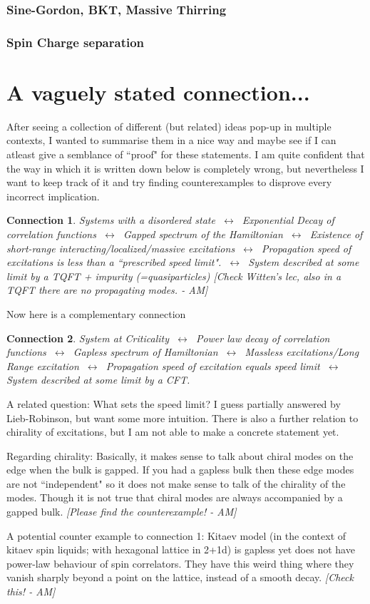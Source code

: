 \documentclass{article}
\newcommand\AM[1]{{\it \color{darkblue}  [#1 - AM]}}
\newtheorem{conn}{Connection}
\begin{document}
\subsubsection{Sine-Gordon, BKT, Massive Thirring}
\subsubsection{Spin Charge separation}
\section{A vaguely stated connection...}
After seeing a collection of different (but related) ideas pop-up in multiple contexts, I wanted to summarise them in a nice way and maybe see if I can atleast give a semblance of ``proof" for these statements. I am quite confident that the way in which it is written down below is completely wrong, but nevertheless I want to keep track of it and try finding counterexamples to disprove every incorrect implication.

\begin{conn}
    Systems with a disordered state $~\longleftrightarrow~$ Exponential Decay of correlation functions 
    $~\longleftrightarrow~$ Gapped spectrum of the Hamiltonian
    $~\longleftrightarrow~$ Existence of short-range interacting/localized/massive excitations
    $~\longleftrightarrow~$ Propagation speed of excitations is less than a ``prescribed speed limit".
    $~\longleftrightarrow~$ System described at some limit by a TQFT + impurity (=quasiparticles) \AM{Check Witten's lec, also in a TQFT there are no propagating modes.}
\end{conn}

Now here is a complementary connection
\begin{conn}
    System at Criticality 
    $~\longleftrightarrow~$ Power law decay of correlation functions
    $~\longleftrightarrow~$ Gapless spectrum of Hamiltonian
    $~\longleftrightarrow~$ Massless excitations/Long Range excitation
    $~\longleftrightarrow~$ Propagation speed of excitation equals speed limit
    $~\longleftrightarrow~$ System described at some limit by a CFT.
\end{conn}
A related question: What sets the speed limit? I guess partially answered by Lieb-Robinson, but want some more intuition. There is also a further relation to chirality of excitations, but I am not able to make a concrete statement yet.

Regarding chirality: Basically, it makes sense to talk about chiral modes on the edge when the bulk is gapped. If you had a gapless bulk then these edge modes are not ``independent" so it does not make sense to talk of the chirality of the modes. Though it is not true that chiral modes are always accompanied by a gapped bulk.\AM{Please find the counterexample!}

A potential counter example to connection 1: Kitaev model (in the context of kitaev spin liquids; with hexagonal lattice in 2+1d) is gapless yet does not have power-law behaviour of spin correlators. They have this weird thing where they vanish sharply beyond a point on the lattice, instead of a smooth decay.\AM{Check this!}


\end{document}

